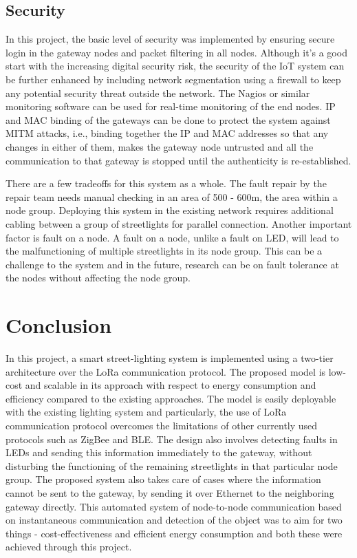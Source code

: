 \documentclass[11pt, oneside]{article}   	%
\begin{document}
\subsection{Security}
In this project, the basic level of security was implemented by ensuring secure login in the gateway nodes and packet filtering in all nodes. Although it's a good start with the increasing digital security risk, the security of the IoT system can be further enhanced by including network segmentation using a firewall to keep any potential security threat outside the network. The Nagios or similar monitoring software can be used for real-time monitoring of the end nodes. IP and MAC binding of the gateways can be done to protect the system against MITM attacks, i.e., binding together the IP and MAC addresses so that any changes in either of them, makes the gateway node untrusted and all the communication to that gateway is stopped until the authenticity is re-established.

There are a few tradeoffs for this system as a whole. The fault repair by the repair team needs manual checking in an area of 500 - 600m, the area within a node group. Deploying this system in the existing network requires additional cabling between a group of streetlights for parallel connection. Another important factor is fault on a node. A fault on a node, unlike a fault on LED, will lead to the malfunctioning of multiple streetlights in its node group. This can be a challenge to the system and in the future, research can be on fault tolerance at the nodes without affecting the node group.


\section{Conclusion}
In this project, a smart street-lighting system is implemented using a two-tier architecture over the LoRa communication protocol. The proposed model is low-cost and scalable in its approach with respect to energy consumption and efficiency compared to the existing approaches. The model is easily deployable with the existing lighting system and particularly, the use of LoRa communication protocol overcomes the limitations of other currently used protocols such as ZigBee and BLE. The design also involves detecting faults in LEDs and sending this information immediately to the gateway, without disturbing the functioning of the remaining streetlights in that particular node group. The proposed system also takes care of cases where the information cannot be sent to the gateway, by sending it over Ethernet to the neighboring gateway directly. This automated system of node-to-node communication based on instantaneous communication and detection of the object was to aim for two things - cost-effectiveness and efficient energy consumption and both these were achieved through this project.
\end{document}
